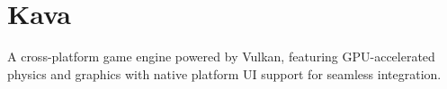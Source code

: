 \chapter{Kava}
\hypertarget{md__r_e_a_d_m_e}{}\label{md__r_e_a_d_m_e}
\label{md__r_e_a_d_m_e_autotoc_md0}%
%


A cross-\/platform game engine powered by Vulkan, featuring GPU-\/accelerated physics and graphics with native platform UI support for seamless integration. 